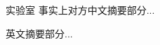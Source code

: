 \begin{cabstract}
    实验室 事实上对方中文摘要部分...
\end{cabstract}

\begin{eabstract}
    英文摘要部分...
\end{eabstract}

